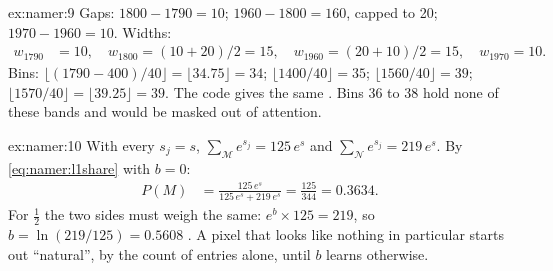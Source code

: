 \begin{solution}{ex:namer:9}
Gaps: $1800-1790=10$; $1960-1800=160$, capped to 20; $1970-1960=10$. Widths:
\begin{align*}
w_{1790} &= 10,\quad w_{1800}=(10+20)/2=15,\quad w_{1960}=(20+10)/2=15,\quad w_{1970}=10 .
\end{align*}
Bins: $\lfloor(1790-400)/40\rfloor=\lfloor34.75\rfloor=34$; $\lfloor1400/40\rfloor=35$; $\lfloor1560/40\rfloor=39$;
$\lfloor1570/40\rfloor=\lfloor39.25\rfloor=39$. The code gives the same \tagC. Bins 36 to 38 hold none of these bands and
would be masked out of attention.
\end{solution}

\begin{solution}{ex:namer:10}
With every $s_j=s$, $\sum_{\mathcal{M}}e^{s_j}=125\,e^{s}$ and $\sum_{\mathcal{N}}e^{s_j}=219\,e^{s}$. By
\cref{eq:namer:l1share} with $b=0$:
\begin{align*}
P(M) &= \frac{125\,e^{s}}{125\,e^{s}+219\,e^{s}} = \frac{125}{344} = 0.3634 .
\end{align*}
For $\frac12$ the two sides must weigh the same: $e^{b}\times125=219$, so $b=\ln(219/125)=0.5608$ \tagC. A pixel that
looks like nothing in particular starts out ``natural'', by the count of entries alone, until $b$ learns otherwise.
\end{solution}
